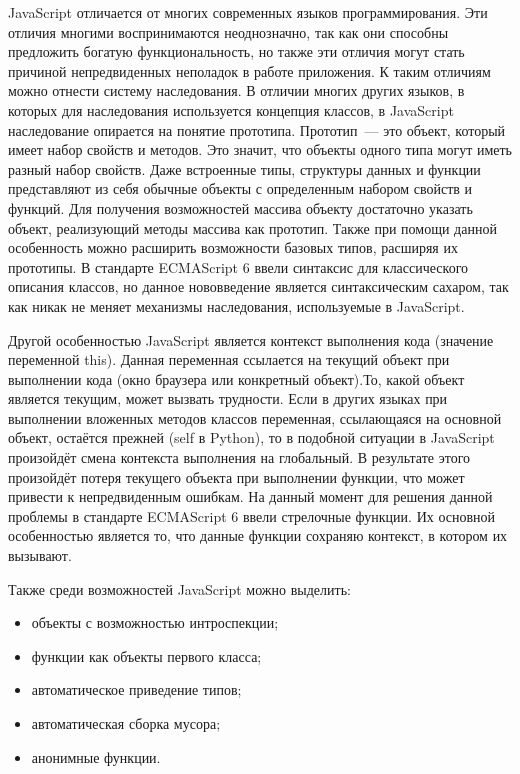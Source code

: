 JavaScript отличается от многих современных языков программирования.
Эти отличия многими воспринимаются неоднозначно, так как они способны предложить богатую функциональность, но также эти отличия могут стать причиной непредвиденных неполадок в работе приложения. К таким отличиям можно отнести систему наследования.
В отличии многих других языков, в которых для наследования используется концепция классов, в JavaScript наследование опирается на понятие прототипа. Прототип~--- это объект, который имеет набор свойств и методов. Это значит, что объекты одного типа могут иметь разный набор свойств. Даже встроенные типы, структуры данных и функции представляют из себя обычные объекты с определенным набором свойств и функций.
Для получения возможностей массива объекту достаточно указать объект, реализующий методы массива как прототип. Также при помощи данной особенность можно расширить возможности базовых типов, расширяя их прототипы. В стандарте ECMAScript 6 ввели синтаксис для классического описания классов, но данное нововведение является синтаксическим сахаром, так как никак не меняет механизмы наследования, используемые в JavaScript.

Другой особенностью JavaScript является контекст выполнения кода (значение переменной this). Данная переменная ссылается на текущий объект при выполнении кода (окно браузера или конкретный объект).То, какой объект является текущим, может вызвать трудности. Если в других языках при выполнении вложенных методов классов переменная, ссылающаяся на основной объект, остаётся прежней (self в Python), то в подобной ситуации в JavaScript произойдёт смена контекста выполнения на глобальный. В результате этого произойдёт потеря текущего объекта при выполнении функции, что может привести к непредвиденным ошибкам. На данный момент для решения данной проблемы в стандарте ECMAScript 6 ввели стрелочные функции. Их основной особенностью является то, что данные функции сохраняю контекст, в котором их вызывают.
 
Также среди возможностей JavaScript можно выделить:
\begin{itemize}
 \item объекты с возможностью интроспекции;
 \item функции как объекты первого класса;
 \item автоматическое приведение типов;
 \item автоматическая сборка мусора;
 \item анонимные функции.
\end{itemize}
 
